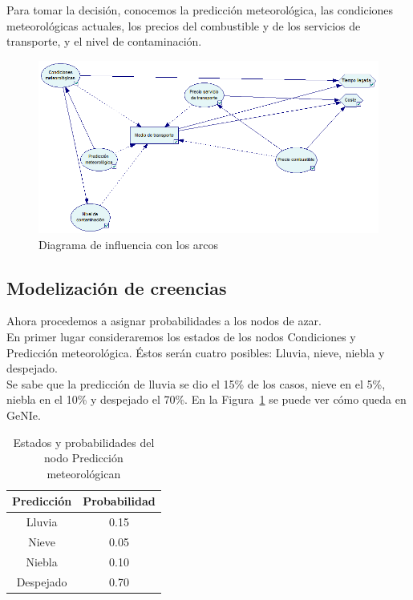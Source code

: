 \documentclass[12pt,a4paper,twoside,openright,titlepage,final]{article}
\begin{document}
Para tomar la decisión, conocemos la predicción meteorológica, las condiciones meteorológicas actuales, los precios del combustible y de los servicios de transporte, y el nivel de contaminación.

\begin{figure}[tbph!]
	\centering
	\includegraphics[width=0.9\linewidth]{imagenes/diagrama_2}
	\caption{Diagrama de influencia con los arcos}
	\label{fig:diagrama_2}
\end{figure}

\subsection{Modelización de creencias}

Ahora procedemos a asignar probabilidades a los nodos de azar.\\

En primer lugar consideraremos los estados de los nodos Condiciones y Predicción meteorológica. Éstos serán cuatro posibles: Lluvia, nieve, niebla y despejado.\\

Se sabe que la predicción de lluvia se dio el 15\% de los casos, nieve en el 5\%, niebla en el 10\% y despejado el 70\%. En la Figura~\ref{tbl:prob_pred_met} se puede ver cómo queda en GeNIe.\\   

\begin{table}[htbp!]
\centering
\caption{Estados y probabilidades del nodo Predicción meteorológican}
\label{tbl:prob_pred_met}
\begin{tabular}{@{}cc@{}}
\toprule
Predicción & Probabilidad \\ \midrule
Lluvia     & 0.15         \\
Nieve      & 0.05         \\
Niebla     & 0.10         \\
Despejado  & 0.70         \\ \bottomrule
\end{tabular}
\end{table}
\end{document}
